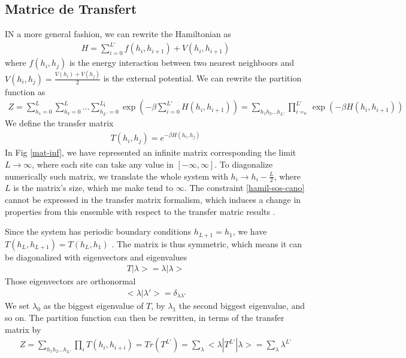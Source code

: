   \subsection{Matrice de Transfert}

{\color{blue}
IN a more general fashion, we can rewrite the Hamiltonian as
\begin{align*}
  H = \sum_{i=0}^{L'} f(h_i,h_{i+1}) + V(h_i,h_{i+1}) 
\end{align*}
where $f(h_i,h_j)$ is the energy interaction between two nearest neighboors and $V(h_i,h_j)=\frac{V(h_i)+V(h_j)}{2}$ is the external potential. We can rewrite the partition function as 
\begin{align}
 Z = \sum_{h_1=0}^{L} \sum_{h_2=0}^{L}... \sum_{h_{L'}=0}^{L¡} \exp(- \beta \sum_{i=0}^{L'} H(h_i,h_{i+1}))
   = \sum_{h_1 h_2 ... h_{L'}} \prod_{i=_0}^{L'} \exp(-\beta H(h_i,h_{i+1}))
\end{align}
We define the transfer matrix
\begin{align}
    T(h_i,h_j) = e^{-\beta H(h_i,h_j)}
    \label{matric-transfert}
\end{align}
In Fig \ref{mat-inf}, we have represented an infinite matrix corresponding the limit $L\to \infty$, where each site can take any value in $[-\infty,\infty]$. To diagonalize numerically such matrix, we translate the whole system with $h_i \to h_i - \frac{L}{2}$, where $L$ is the matrix's size, which me make tend to $\infty$.
The constraint \eqref{hamil-sos-cano} cannot be expressed in the transfer matrix formalism, which induces a change in properties from this ensemble with respect to the transfer matric results \cite{siegert_scaling_1993}.

Since the system has periodic boundary conditions  $h_{L+1} = h_1$, we have $T(h_L,h_{L+1}) = T(h_L,h_1)$ \cite{pearce_exact_1989}. The matrix is thus symmetric, which means it can be diagonalized with eigenvectors and eigenvalues 
\begin{align}
    T | \lambda> = \lambda |\lambda>
\end{align}
Those eigenvectors are orthonormal
\begin{align}
    < \lambda | \lambda'> = \delta_{\lambda \lambda'}
\end{align}
We set $\lambda_0$ as the biggest eigenvalue of $T$, by $\lambda_1$ the second biggest eigenvalue, and so on. The partition function can then be rewritten, in terms of the transfer matrix  \cite{abraham_transfer_1973} by
\begin{align}
  Z = \sum_{h_1 h_2 ... h_{L'}} \prod_{i} T(h_i,h_{i+i}) = Tr( T^{L'})  = \sum_\lambda <\lambda | T^{L'} | \lambda> = \sum_\lambda \lambda^{L'}
  \label{partition-trace-lambda}
\end{align}

}
